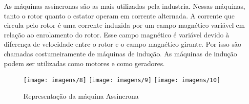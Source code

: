 As máquinas assíncronas são as mais utilizadas pela industria. Nessas máquinas, tanto o rotor quanto o estator operam em corrente alternada. A corrente que circula pelo rotor é uma corrente induzida por um campo magnético variável em relação ao enrolamento do rotor. Esse campo magnético é variável devido à diferença de velocidade entre o rotor e o campo magnético girante. Por isso são chamadas costumeiramente de máquinas de indução. As máquinas de indução podem ser utilizadas como motores e como geradores.

\begin{figure}[ht]
    \center
    \texttt{[image: imagens/8]}
    \texttt{[image: imagens/9]}
    \texttt{[image: imagens/10]}
    \caption{Representação da máquina Assíncrona}
\end{figure}

